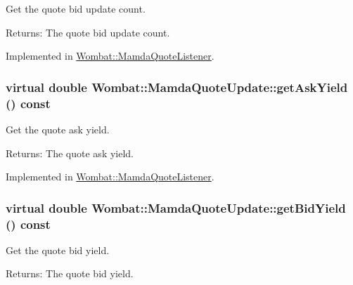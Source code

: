 Get the quote bid update count. 

\begin{Desc}
\item[Returns:]The quote bid update count. \end{Desc}


Implemented in \hyperlink{classWombat_1_1MamdaQuoteListener_d9c60e9325eaaa4ae2b5af91201dfb3f}{Wombat::Mamda\-Quote\-Listener}.\hypertarget{classWombat_1_1MamdaQuoteUpdate_0556f73b7cf3c9bc08032902375d0853}{
\subsubsection[getAskYield]{\setlength{\rightskip}{0pt plus 5cm}virtual double Wombat::Mamda\-Quote\-Update::get\-Ask\-Yield () const}}
\label{classWombat_1_1MamdaQuoteUpdate_0556f73b7cf3c9bc08032902375d0853}


Get the quote ask yield. 

\begin{Desc}
\item[Returns:]The quote ask yield. \end{Desc}


Implemented in \hyperlink{classWombat_1_1MamdaQuoteListener_49a6a64974327a037d1470cf433d93e0}{Wombat::Mamda\-Quote\-Listener}.\hypertarget{classWombat_1_1MamdaQuoteUpdate_fa0ade5605db4d673d9a46883983f28f}{
\subsubsection[getBidYield]{\setlength{\rightskip}{0pt plus 5cm}virtual double Wombat::Mamda\-Quote\-Update::get\-Bid\-Yield () const}}
\label{classWombat_1_1MamdaQuoteUpdate_fa0ade5605db4d673d9a46883983f28f}


Get the quote bid yield. 

\begin{Desc}
\item[Returns:]The quote bid yield. \end{Desc}


